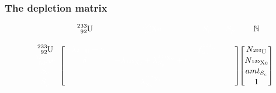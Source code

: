 \documentclass{beamer}
\def\w{\color{white}}
\def\b{\color{black}}
\begin{document}
\begin{frame}
\frametitle{The depletion matrix}
    \begin{equation*}
        \begin{blockarray}{cccccc}
             &
            \b \ce{^{233}_{92}U} &
            \w \ce{^{135}_{54}Xe} &
            \w S_{c} &
            \w S_{p} &
            \mathbb{N} \\
             &
             &
             &
             &
             &
             \\ 
        \begin{block}{c[cccc][c]}
            \b \ce{^{233}_{92}U} &
            \w -\lambda_{\ce{^{233}U}} + \gamma &
             &
            \w f_{S_{c}}^{\ce{^{233}U}} &
             &
            N_{\ce{^{233}U}} \\
            \w \ce{^{135}_{54}Xe} &
            \w \delta &
            \w -\lambda_{\ce{^{135}Xe}} + \lambda_{S_{p}}^{\ce{^{135}Xe}} +
                \epsilon &
             &
             &
            N_{\ce{^{135}Xe}} \\
            \w S_{c} &
             &
             &
             &
             &
            amt_{S_{c}} \\
            \w S_{p} &
             &
            \w \lambda_{S_{p}}^{\ce{^{135}Xe}} &
             &
             &
             1\\
        \end{block}
        \end{blockarray}
    \end{equation*}

\end{frame}
\end{document}
